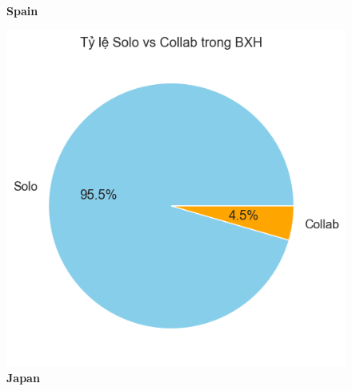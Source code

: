 \begin{itemize}
\begin{figure}[H]
\begin{minipage}{0.38\textwidth}
            \\[4pt] {\small \textbf{Spain}}
        \end{minipage}

    \end{figure}


    \begin{figure}[H]
        \centering
        \begin{minipage}{0.38\textwidth}
            \centering
            \includegraphics[width=\linewidth]{../graphics/data_top50/figure/21/EDA_japan.png}
            \\[4pt] {\small \textbf{Japan}}
        \end{minipage}
        \hfill
        \begin{minipage}{0.38\textwidth}
            \centering

\end{minipage}
\end{figure}
\end{itemize}
